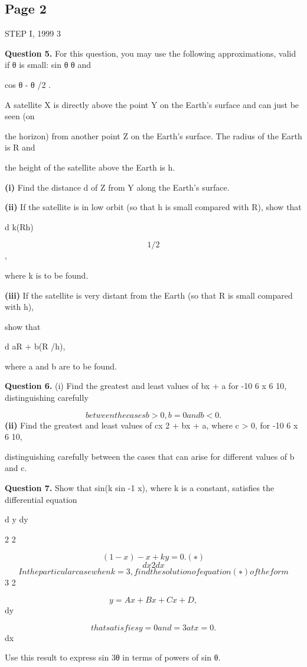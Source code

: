 \documentclass[12pt]{article}
\begin{document}
\subsection*{Page 2}
\begin{flushleft}
STEP I, 1999 3\par
\bigskip\textbf{Question 5.} For this question, you may use the following approximations, valid if θ is small: sin θ \approx θ and\par
cos θ  - θ /2 .\par
A satellite X is directly above the point Y on the Earth's surface and can just be seen (on\par
the horizon) from another point Z on the Earth's surface. The radius of the Earth is R and\par
the height of the satellite above the Earth is h.\par
\textbf{(i)} Find the distance d of Z from Y along the Earth's surface.\par
\textbf{(ii)} If the satellite is in low orbit (so that h is small compared with R), show that\par
d \approx k(Rh)\par
\[1/2\]
,\par
where k is to be found.\par
\textbf{(iii)} If the satellite is very distant from the Earth (so that R is small compared with h),\par
show that\par
d \approx aR + b(R /h),\par
where a and b are to be found.\par
\bigskip\textbf{Question 6.} (i) Find the greatest and least values of bx + a for -10 6 x 6 10, distinguishing carefully\par
\[between the cases b > 0, b = 0 and b < 0.\]
\textbf{(ii)} Find the greatest and least values of cx 2 + bx + a, where c > 0, for -10 6 x 6 10,\par
distinguishing carefully between the cases that can arise for different values of b and c.\par
\bigskip\textbf{Question 7.} Show that sin(k sin -1 x), where k is a constant, satisfies the differential equation\par
d y dy\par
2 2\par
\[(1 - x ) - x + k y = 0. (∗)\]
\[dx2 dx\]
\[In the particular case when k = 3, find the solution of equation (∗) of the form\]
3 2\par
\[y = Ax + Bx + Cx + D,\]
dy\par
\[that satisfies y = 0 and = 3 at x = 0.\]
dx\par
Use this result to express sin 3θ in terms of powers of sin θ.\par
\end{flushleft}
\end{document}
